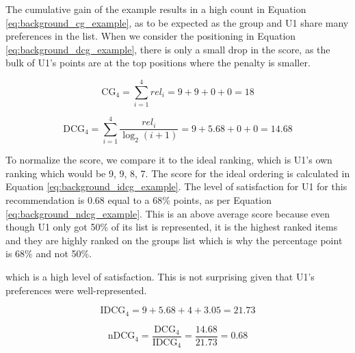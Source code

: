 The cumulative gain of the example results in a high count in Equation \ref{eq:background_cg_example}, as to be expected as the group and U1 share many preferences in the list. When we consider the positioning in Equation \ref{eq:background_dcg_example}, there is only a small drop in the score, as the bulk of U1's points are at the top positions where the penalty is smaller.

\begin{equation}\label{eq:background_cg_example}
\text{CG}_4 = \sum_{i=1}^{4}\textit{rel}_i = 9 + 9 + 0 + 0 = 18
\end{equation}

\begin{equation}\label{eq:background_dcg_example}
\text{DCG}_4 = \sum_{i=1}^{4}\frac{\textit{rel}_i}{\log_2(i + 1)}
= 9 + 5.68 + 0 + 0 = 14.68
\end{equation}

To normalize the score, we compare it to the ideal ranking, which is U1's own ranking which would be 9, 9, 8, 7. The score for the ideal ordering is calculated in Equation \ref{eq:background_idcg_example}. The level of satisfaction for U1 for this recommendation is $0.68$ equal to a 68\% points, as per Equation \ref{eq:background_ndcg_example}. This is an above average score because even though U1 only got 50\% of its list is represented, it is the highest ranked items and they are highly ranked on the groups list which is why the percentage point is 68\% and not 50\%. 

which is a high level of satisfaction. This is not surprising given that U1's preferences were well-represented.

\begin{equation}\label{eq:background_idcg_example}
\text{IDCG}_4 = 9 + 5.68 + 4 + 3.05 = 21.73
\end{equation}

\begin{equation}\label{eq:background_ndcg_example}
\text{nDCG}_4 = \frac{\text{DCG}_4}{\text{IDCG}_4} = \frac{14.68}{21.73}=0.68
\end{equation}